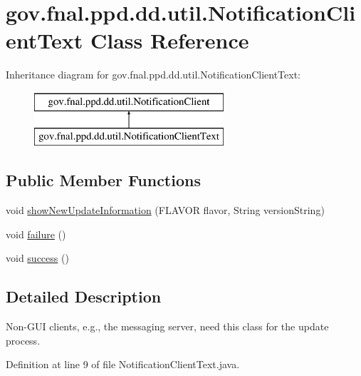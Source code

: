 \hypertarget{classgov_1_1fnal_1_1ppd_1_1dd_1_1util_1_1NotificationClientText}{\section{gov.\-fnal.\-ppd.\-dd.\-util.\-Notification\-Client\-Text Class Reference}
\label{classgov_1_1fnal_1_1ppd_1_1dd_1_1util_1_1NotificationClientText}
}
Inheritance diagram for gov.\-fnal.\-ppd.\-dd.\-util.\-Notification\-Client\-Text\-:\begin{figure}[H]
\begin{center}
\leavevmode
\includegraphics[height=2.000000cm]{classgov_1_1fnal_1_1ppd_1_1dd_1_1util_1_1NotificationClientText}
\end{center}
\end{figure}
\subsection*{Public Member Functions}
\begin{DoxyCompactItemize}
\item 
void \hyperlink{classgov_1_1fnal_1_1ppd_1_1dd_1_1util_1_1NotificationClientText_a101830e2bc0bd606f0c1d51e2426cafd}{show\-New\-Update\-Information} (F\-L\-A\-V\-O\-R flavor, String version\-String)
\item 
void \hyperlink{classgov_1_1fnal_1_1ppd_1_1dd_1_1util_1_1NotificationClientText_ac45efc4a5d0d7f50d21cbae42f9e08cb}{failure} ()
\item 
void \hyperlink{classgov_1_1fnal_1_1ppd_1_1dd_1_1util_1_1NotificationClientText_a5deeec962527801cc0eed2c78f303d9d}{success} ()
\end{DoxyCompactItemize}


\subsection{Detailed Description}
Non-\/\-G\-U\-I clients, e.\-g., the messaging server, need this class for the update process. 

Definition at line 9 of file Notification\-Client\-Text.\-java.



